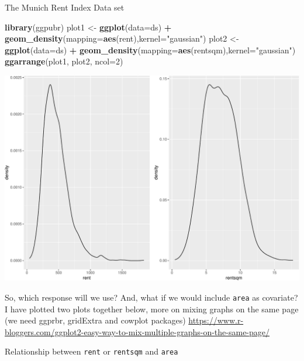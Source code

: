 \documentclass[
  ignorenonframetext,
]{beamer}
\newenvironment{Shaded}{\begin{snugshade}}{\end{snugshade}}
\newcommand{\AttributeTok}[1]{\textcolor[rgb]{0.13,0.29,0.53}{#1}}
\newcommand{\DecValTok}[1]{\textcolor[rgb]{0.00,0.00,0.81}{#1}}
\newcommand{\FunctionTok}[1]{\textcolor[rgb]{0.13,0.29,0.53}{\textbf{#1}}}
\newcommand{\NormalTok}[1]{#1}
\newcommand{\OtherTok}[1]{\textcolor[rgb]{0.56,0.35,0.01}{#1}}
\newcommand{\SpecialCharTok}[1]{\textcolor[rgb]{0.81,0.36,0.00}{\textbf{#1}}}
\newcommand{\StringTok}[1]{\textcolor[rgb]{0.31,0.60,0.02}{#1}}
\begin{document}
\begin{frame}[fragile]
\begin{block}{The Munich Rent Index Data set}
\begin{Shaded}
\begin{Highlighting}[]
\FunctionTok{library}\NormalTok{(ggpubr)}
\NormalTok{plot1 }\OtherTok{\textless{}{-}} \FunctionTok{ggplot}\NormalTok{(}\AttributeTok{data=}\NormalTok{ds) }\SpecialCharTok{+}
  \FunctionTok{geom\_density}\NormalTok{(}\AttributeTok{mapping=}\FunctionTok{aes}\NormalTok{(rent),}\AttributeTok{kernel=}\StringTok{"gaussian"}\NormalTok{)}
\NormalTok{plot2 }\OtherTok{\textless{}{-}} \FunctionTok{ggplot}\NormalTok{(}\AttributeTok{data=}\NormalTok{ds) }\SpecialCharTok{+}
  \FunctionTok{geom\_density}\NormalTok{(}\AttributeTok{mapping=}\FunctionTok{aes}\NormalTok{(rentsqm),}\AttributeTok{kernel=}\StringTok{"gaussian"}\NormalTok{)}
\FunctionTok{ggarrange}\NormalTok{(plot1, plot2, }\AttributeTok{ncol=}\DecValTok{2}\NormalTok{)}
\end{Highlighting}
\end{Shaded}

\includegraphics{Module01IntroPresentation_files/figure-beamer/unnamed-chunk-5-1.pdf}

So, which response will we use? And, what if we would include
\texttt{area} as covariate? I have plotted two plots together below,
more on mixing graphs on the same page (we need ggprbr, gridExtra and
cowplot packages)
\url{https://www.r-bloggers.com/ggplot2-easy-way-to-mix-multiple-graphs-on-the-same-page/}

Relationship between \texttt{rent} or \texttt{rentsqm} and \texttt{area}


\end{block}
\end{frame}
\end{document}

